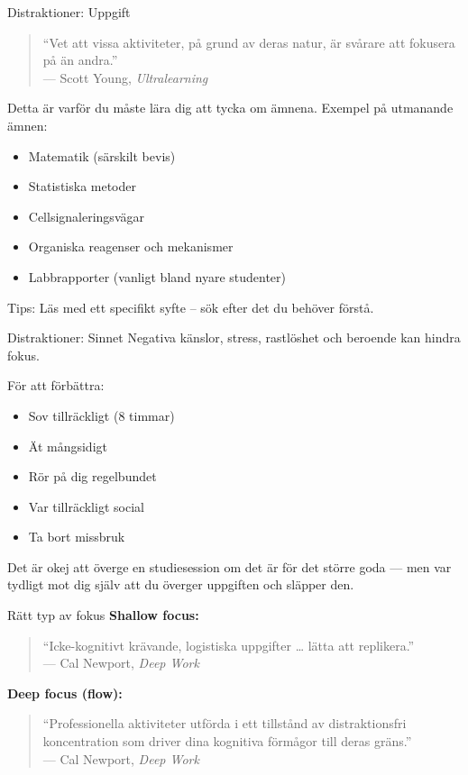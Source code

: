 \documentclass[presentation]{beamer}
\begin{document}
\begin{frame}{Distraktioner: Uppgift}
\begin{quote}
“Vet att vissa aktiviteter, på grund av deras natur, är svårare att fokusera på än andra.”\\
— Scott Young, \textit{Ultralearning}
\end{quote}

Detta är varför du måste lära dig att tycka om ämnena.
Exempel på utmanande ämnen:
\begin{itemize}
    \item Matematik (särskilt bevis)
    \item Statistiska metoder
    \item Cellsignaleringsvägar
    \item Organiska reagenser och mekanismer
    \item Labbrapporter (vanligt bland nyare studenter)
\end{itemize}
Tips: Läs med ett specifikt syfte – sök efter det du behöver förstå.
\end{frame}

\begin{frame}{Distraktioner: Sinnet}
Negativa känslor, stress, rastlöshet och beroende kan hindra fokus.

För att förbättra:
\begin{itemize}
    \item Sov tillräckligt (8 timmar)
    \item Ät mångsidigt
    \item Rör på dig regelbundet
    \item Var tillräckligt social
    \item Ta bort missbruk
\end{itemize}

Det är okej att överge en studiesession om det är för det större goda --- men var tydligt mot dig själv att du överger uppgiften och släpper den.
\end{frame}

\begin{frame}{Rätt typ av fokus}
\textbf{Shallow focus:}
\begin{quote}
“Icke-kognitivt krävande, logistiska uppgifter …  lätta att replikera.”\\
— Cal Newport, \textit{Deep Work}
\end{quote}

\textbf{Deep focus (flow):}
\begin{quote}
“Professionella aktiviteter utförda i ett tillstånd av distraktionsfri koncentration som driver dina kognitiva förmågor till deras gräns.”\\
— Cal Newport, \textit{Deep Work}
\end{quote}
\end{frame}
\end{document}
